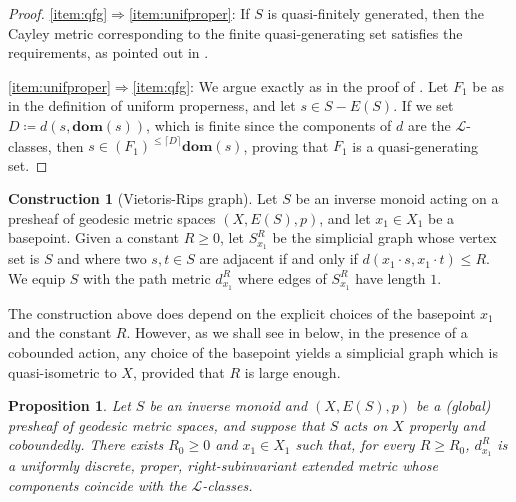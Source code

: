 \documentclass[svgnames]{amsart}
\theoremstyle{plain}
\newtheorem{prop}[thm]{Proposition}
\theoremstyle{definition}
\newtheorem{construction}[thm]{Construction}
\newcommand{\dom}[1]{\mathbf{dom}\left(#1\right)}
\begin{document}
\begin{proof}
    \eqref{item:qfg}$\Rightarrow$\eqref{item:unifproper}: If $S$ is quasi-finitely generated, then the Cayley metric corresponding to the finite quasi-generating set satisfies the requirements, as pointed out in \cite[Example 3.4]{Chung_Martinez_szakacs}.

    \eqref{item:unifproper}$\Rightarrow$\eqref{item:qfg}: We argue exactly as in the proof of \cite[Theorem 3.23]{Chung_Martinez_szakacs}. Let $F_1$ be as in the definition of uniform properness, and let $s\in S-E(S)$. If we set $D\coloneq d(s,\dom{s})$, which is finite since the components of $d$ are the $\mathcal{L}$-classes, then $s\in (F_1)^{\leq\lceil D\rceil} \dom{s}$, proving that $F_1$ is a quasi-generating set.
\end{proof}

\begin{construction}[Vietoris-Rips graph]
    Let $S$ be an inverse monoid acting on a presheaf of geodesic metric spaces $(X, E(S),p)$, and let $x_1\in X_1$ be a basepoint. Given a constant $R\ge 0$, let $S^R_{x_1}$ be the simplicial graph whose vertex set is $S$ and where two $s,t\in S$ are adjacent if and only if $d(x_1\cdot s,x_1\cdot t)\le R $. We equip $S$ with the path metric $d^R_{x_1}$ where edges of $S^R_{x_1}$ have length $1$.
\end{construction}
\noindent The construction above does depend on the explicit choices of the basepoint $x_1$ and the constant $R$. However, as we shall see in  below, in the presence of a cobounded action, any choice of the basepoint yields a simplicial graph which is quasi-isometric to $X$, provided that $R$ is large enough. 

\begin{prop}\label{prop:action_gives_metric}
    Let $S$ be an inverse monoid and $(X, E(S),p)$ be a (global) presheaf of geodesic metric spaces, and suppose that $S$ acts on $X$ properly and coboundedly. There exists $R_0 \geq 0$ and $x_1 \in X_1$ such that, for every $R\ge R_0$, $d^R_{x_1}$ is a uniformly discrete, proper, right-subinvariant extended metric whose components coincide with the $\mathcal L$-classes.
\end{prop}
\end{document}
